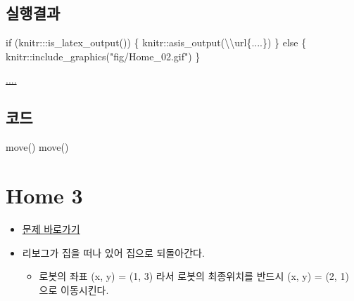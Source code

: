 \documentclass[
  b5paperpaper,
  DIV=11,
  numbers=noendperiod]{scrreprt}
\newenvironment{Shaded}{\begin{snugshade}}{\end{snugshade}}
\newcommand{\ControlFlowTok}[1]{\textcolor[rgb]{0.00,0.23,0.31}{#1}}
\newcommand{\FunctionTok}[1]{\textcolor[rgb]{0.28,0.35,0.67}{#1}}
\newcommand{\NormalTok}[1]{\textcolor[rgb]{0.00,0.23,0.31}{#1}}
\newcommand{\SpecialCharTok}[1]{\textcolor[rgb]{0.37,0.37,0.37}{#1}}
\newcommand{\StringTok}[1]{\textcolor[rgb]{0.13,0.47,0.30}{#1}}
\providecommand{\tightlist}{%
  \setlength{\itemsep}{0pt}\setlength{\parskip}{0pt}}\usepackage{longtable,booktabs,array}
\begin{document}
\hypertarget{uxc2e4uxd589uxacb0uxacfc-2}{%
\subsection{실행결과}\label{uxc2e4uxd589uxacb0uxacfc-2}}

\begin{Shaded}
\begin{Highlighting}[]
\ControlFlowTok{if}\NormalTok{ (knitr}\SpecialCharTok{:::}\FunctionTok{is\_latex\_output}\NormalTok{()) \{}
\NormalTok{  knitr}\SpecialCharTok{::}\FunctionTok{asis\_output}\NormalTok{(}\StringTok{\textquotesingle{}}\SpecialCharTok{\textbackslash{}\textbackslash{}}\StringTok{url\{....\}\textquotesingle{}}\NormalTok{)}
\NormalTok{\} }\ControlFlowTok{else}\NormalTok{ \{}
\NormalTok{  knitr}\SpecialCharTok{::}\FunctionTok{include\_graphics}\NormalTok{(}\StringTok{"fig/Home\_02.gif"}\NormalTok{)}
\NormalTok{\}}
\end{Highlighting}
\end{Shaded}

\url{....}

\hypertarget{uxcf54uxb4dc-2}{%
\subsection{코드}\label{uxcf54uxb4dc-2}}

\begin{Shaded}
\begin{Highlighting}[]
\FunctionTok{move}\NormalTok{()}
\FunctionTok{move}\NormalTok{()}
\end{Highlighting}
\end{Shaded}

\hypertarget{home-03}{%
\section{Home 3}\label{home-03}}

\begin{itemize}
\tightlist
\item
  \href{https://reeborg.ca/reeborg.html?lang=ko-en\&mode=python\&menu=worlds\%2Fmenus\%2Freeborg_intro_en.json\&name=Home\%203\&url=worlds\%2Ftutorial_en\%2Fhome3.json}{문제
  바로가기}
\item
  리보그가 집을 떠나 있어 집으로 되돌아간다.

  \begin{itemize}
  \tightlist
  \item
    로봇의 좌표 (x, y) = (1, 3) 라서 로봇의 최종위치를 반드시 (x, y) =
    (2, 1) 으로 이동시킨다.
  \end{itemize}
\end{itemize}
\end{document}
